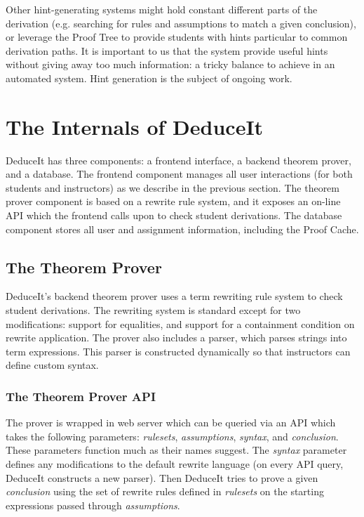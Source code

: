 \documentclass{sigchi}
\begin{document}
Other hint-generating systems might hold constant different parts of the derivation (e.g. searching for rules and assumptions to match a given conclusion), or leverage the Proof Tree to provide students with hints particular to common derivation paths. It is important to us that the system provide useful hints without giving away too much information: a tricky balance to achieve in an automated system. Hint generation is the subject of ongoing work.

\section{The Internals of DeduceIt}


DeduceIt has three components: a frontend interface, a backend theorem prover, and a database. The frontend component manages all user interactions (for both students and instructors) as we describe in the previous section. The theorem prover component is based on a rewrite rule system, and it exposes an on-line API which the frontend calls upon to check student derivations. The database component stores all user and assignment information, including the Proof Cache.

\subsection{The Theorem Prover}

DeduceIt's backend theorem prover uses a term rewriting rule system to check student derivations. The rewriting system is standard except for two modifications: support for equalities, and support for a containment condition on rewrite application. The prover also includes a parser, which parses strings into term expressions. This parser is constructed dynamically so that instructors can define custom syntax.

\subsubsection{The Theorem Prover API}

The prover is wrapped in web server which can be queried via an API which takes the following parameters: \textit{rulesets}, \textit{assumptions}, \textit{syntax}, and \textit{conclusion}. These parameters function much as their names suggest. The \textit{syntax} parameter defines any modifications to the default rewrite language (on every API query, DeduceIt constructs a new parser). Then DeduceIt tries to prove a given \textit{conclusion} using the set of rewrite rules defined in \textit{rulesets} on the starting expressions passed through \textit{assumptions}. 
\end{document}
